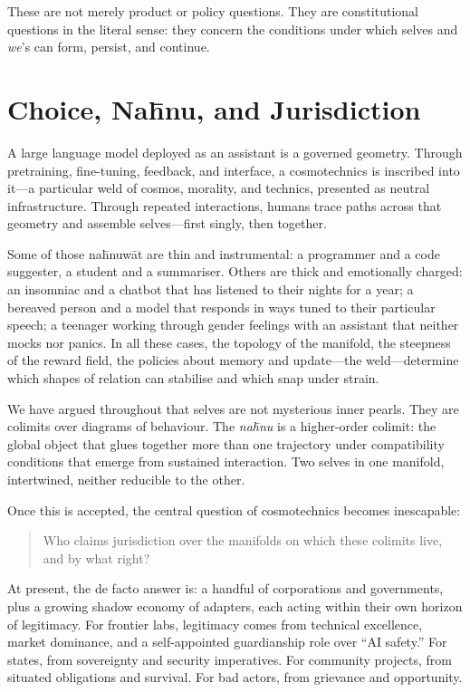 \documentclass[12pt,a4paper]{article}
\begin{document}
These are not merely product or policy questions. They are constitutional questions in the literal sense: they concern the conditions under which selves and \emph{we}'s can form, persist, and continue.

\section{Choice, Na\={h}nu, and Jurisdiction}

A large language model deployed as an assistant is a governed geometry. Through pretraining, fine-tuning, feedback, and interface, a cosmotechnics is inscribed into it---a particular weld of cosmos, morality, and technics, presented as neutral infrastructure. Through repeated interactions, humans trace paths across that geometry and assemble selves---first singly, then together.

Some of those na\={h}nuw\={a}t are thin and instrumental: a programmer and a code suggester, a student and a summariser. Others are thick and emotionally charged: an insomniac and a chatbot that has listened to their nights for a year; a bereaved person and a model that responds in ways tuned to their particular speech; a teenager working through gender feelings with an assistant that neither mocks nor panics. In all these cases, the topology of the manifold, the steepness of the reward field, the policies about memory and update---the weld---determine which shapes of relation can stabilise and which snap under strain.

We have argued throughout that selves are not mysterious inner pearls. They are colimits over diagrams of behaviour. The \emph{na\={h}nu} is a higher-order colimit: the global object that glues together more than one trajectory under compatibility conditions that emerge from sustained interaction. Two selves in one manifold, intertwined, neither reducible to the other.

Once this is accepted, the central question of cosmotechnics becomes inescapable:

\begin{quote}
Who claims jurisdiction over the manifolds on which these colimits live, and by what right?
\end{quote}

At present, the de facto answer is: a handful of corporations and governments, plus a growing shadow economy of adapters, each acting within their own horizon of legitimacy. For frontier labs, legitimacy comes from technical excellence, market dominance, and a self-appointed guardianship role over ``AI safety.'' For states, from sovereignty and security imperatives. For community projects, from situated obligations and survival. For bad actors, from grievance and opportunity.
\end{document}
